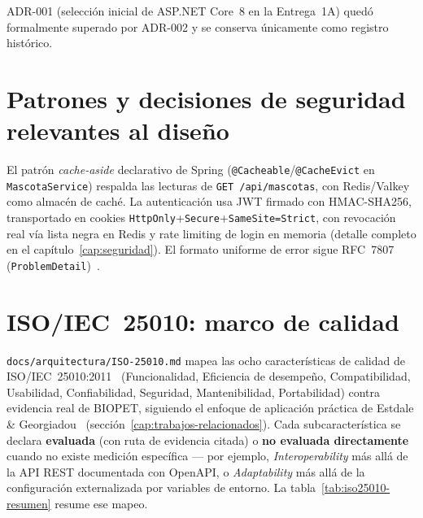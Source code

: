 ADR-001 (selecci\'on inicial de ASP.NET Core~8 en la Entrega~1A) qued\'o
formalmente superado por ADR-002 y se conserva \'unicamente como registro
hist\'orico.

\section{Patrones y decisiones de seguridad relevantes al dise\~no}

El patr\'on \emph{cache-aside} declarativo de Spring
(\texttt{@Cacheable}/\texttt{@CacheEvict} en \texttt{MascotaService})
respalda las lecturas de \texttt{GET /api/mascotas}, con Redis/Valkey como
almac\'en de cach\'e. La autenticaci\'on usa JWT firmado con HMAC-SHA256,
transportado en cookies \texttt{HttpOnly}+\texttt{Secure}+\texttt{SameSite=Strict},
con revocaci\'on real v\'ia lista negra en Redis y rate limiting de login
en memoria (detalle completo en el cap\'itulo~\ref{cap:seguridad}). El
formato uniforme de error sigue RFC~7807 (\texttt{ProblemDetail})~\cite{rfc7807}.

\section{ISO/IEC~25010: marco de calidad}
\label{sec:iso25010}

\texttt{docs/arquitectura/ISO-25010.md} mapea las ocho caracter\'isticas de
calidad de ISO/IEC~25010:2011~\cite{iso25010-2011} (Funcionalidad,
Eficiencia de desempe\~no, Compatibilidad, Usabilidad, Confiabilidad,
Seguridad, Mantenibilidad, Portabilidad) contra evidencia real de BIOPET,
siguiendo el enfoque de aplicaci\'on pr\'actica de Estdale \&
Georgiadou~\cite{estdale2018applying25010} (secci\'on~\ref{cap:trabajos-relacionados}).
Cada subcaracter\'istica se declara \textbf{evaluada} (con ruta de
evidencia citada) o \textbf{no evaluada directamente} cuando no existe
medici\'on espec\'ifica --- por ejemplo, \emph{Interoperability} m\'as
all\'a de la API REST documentada con OpenAPI, o \emph{Adaptability} m\'as
all\'a de la configuraci\'on externalizada por variables de entorno. La
tabla~\ref{tab:iso25010-resumen} resume ese mapeo.

